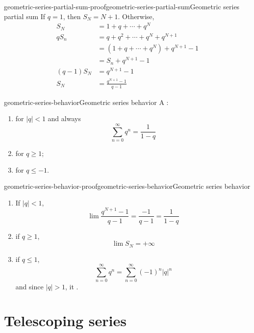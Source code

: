 \documentclass[preview]{standalone}
\begin{document}
\begin{snippetproof}{geometric-series-partial-sum-proof}{geometric-series-partial-sum}{Geometric series partial sum}
    If \(q=1\), then \(S_N = N+1\).
    Otherwise,
    \begin{align*}
        S_N &= 1 + q + \cdots + q^N \\
        q S_n &= q + q^2 + \cdots + q^N + q^{N+1} \\
        &= (1 + q + \cdots + q^N) + q^{N+1} - 1 \\
        &= S_n + q^{N+1}-1 \\
        (q-1) S_N &= q^{N+1} - 1 \\
        S_N &= \frac{q^{N+1} - 1}{q-1}
    \end{align*}
\end{snippetproof}

\begin{snippettheorem}{geometric-series-behavior}{Geometric series behavior}
    A \geometricseries:
    \begin{enumerate}
        \item \seriesconverges for \(|q| < 1\) and always \convergesabsolutely
            \[
                \sum_{n=0}^\infty q^n = \frac{1}{1-q}
            \]
        \item \seriesdiverges for \(q \geq 1\);
        \item \seriesoscillates for \(q \leq -1\).
    \end{enumerate}
\end{snippettheorem}

\begin{snippetproof}{geometric-series-behavior-proof}{geometric-series-behavior}{Geometric series behavior}
    \begin{enumerate}
        \item If \(|q| < 1\),
            \[
                \lim \frac{q^{N+1} - 1}{q-1} = \frac{-1}{q-1} = \frac{1}{1-q}
            \]
        \item if \(q \geq 1\),
            \[ \lim S_N = +\infty \]
        \item if \(q \leq 1\),
            \[
                \sum_{n=0}^\infty q^n =
                \sum_{n=0}^\infty {(-1)}^n {|q|}^n
            \]
            and since \(|q|>1\), it \seriesoscillates.
    \end{enumerate}
\end{snippetproof}

\section{Telescoping series}
\end{document}
